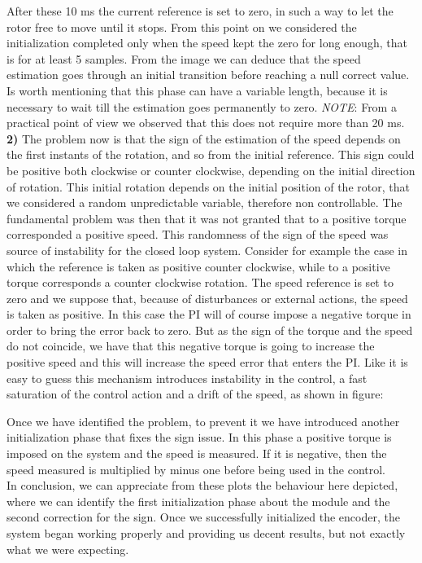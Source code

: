 \documentclass[12pt]{article}
\begin{document}
After these 10 ms the current reference is set to zero, in such a way to let the rotor free to move until it stops. 
From this point on we considered the initialization completed only when the speed kept the zero for long enough, that is for at least 5 samples. 
From the image we can deduce that the speed estimation goes through an initial transition before reaching a null correct value. 
Is worth mentioning that this phase can have a variable length, because it is necessary to wait till the estimation goes permanently to zero. 
\textit{NOTE}: From a practical point of view we observed that this does not require more than 20 ms.\\[1cm] 
\textbf{2)} The problem now is that the sign of the estimation of the speed depends on the first instants of the rotation, and so from the initial reference. This sign could be positive both clockwise or counter clockwise, depending on the initial direction of rotation. This initial rotation depends on the initial position of the rotor, that we considered a random unpredictable variable, therefore non controllable. 
The fundamental problem was then that it was not granted that to a positive torque corresponded a positive speed. 
This randomness of the sign of the speed was source of instability for the closed loop system.
Consider for example the case in which the reference is taken as positive counter clockwise, while to a positive torque corresponds a counter clockwise rotation. The speed reference is set to zero and we suppose that, because of disturbances or external actions, the speed is taken as positive. 
In this case the PI will of course impose a negative torque in order to bring the error back to zero.
But as the sign of the torque and the speed do not coincide, we have that this negative torque is going to increase the positive speed and this will increase the speed error that enters the PI. 
Like it is easy to guess this mechanism introduces instability in the control, a fast saturation of the control action and a drift of the speed, as shown in figure:

Once we have identified the problem, to prevent it we have introduced another initialization phase that fixes the sign issue. 
In this phase a positive torque is imposed on the system and the speed is measured. If it is negative, then the speed measured is multiplied by minus one before being used in the control.\\
In conclusion, we can appreciate from these plots the behaviour here depicted, where we can identify the first initialization phase about the module and the second correction for the sign.  
Once we successfully initialized the encoder, the system began working properly and providing us decent results, but not exactly what we were expecting. 
\end{document}
